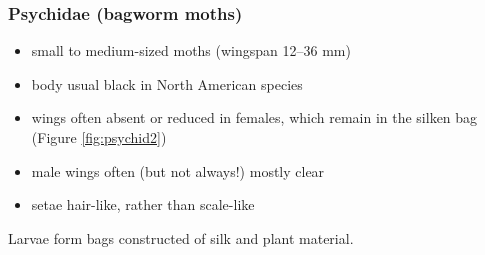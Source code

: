 \documentclass[letterpaper, 11pt]{article}
\begin{document}
\subsubsection{Psychidae (bagworm moths)}
\begin{itemize}
\item small to medium-sized moths (wingspan 12--36 mm)
\item body usual black in North American species
\item wings often absent or reduced in females, which remain in the silken bag (Figure \ref{fig:psychid2})
\item male wings often (but not always!) mostly clear
\item setae hair-like, rather than scale-like
\end{itemize}
Larvae form bags constructed of silk and plant material.
\end{document}
